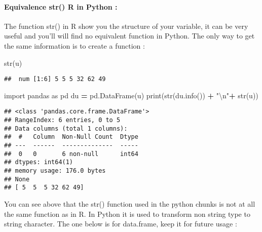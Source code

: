 \documentclass[
]{article}
\newenvironment{Shaded}{\begin{snugshade}}{\end{snugshade}}
\newcommand{\BuiltInTok}[1]{#1}
\newcommand{\CharTok}[1]{\textcolor[rgb]{0.31,0.60,0.02}{#1}}
\newcommand{\FunctionTok}[1]{\textcolor[rgb]{0.00,0.00,0.00}{#1}}
\newcommand{\ImportTok}[1]{#1}
\newcommand{\NormalTok}[1]{#1}
\newcommand{\OperatorTok}[1]{\textcolor[rgb]{0.81,0.36,0.00}{\textbf{#1}}}
\newcommand{\StringTok}[1]{\textcolor[rgb]{0.31,0.60,0.02}{#1}}
\begin{document}
\newline

\hypertarget{equivalence-str-r-in-python}{%
\paragraph{Equivalence str() R in Python
:}\label{equivalence-str-r-in-python}}

The function str() in R show you the structure of your variable, it can
be very useful and you'll will find no equivalent function in Python.
The only way to get the same information is to create a function :

\begin{Shaded}
\begin{Highlighting}[]
\FunctionTok{str}\NormalTok{(u)}
\end{Highlighting}
\end{Shaded}

\begin{verbatim}
##  num [1:6] 5 5 5 32 62 49
\end{verbatim}

\begin{Shaded}
\begin{Highlighting}[]
\ImportTok{import}\NormalTok{ pandas }\ImportTok{as}\NormalTok{ pd}
\NormalTok{du }\OperatorTok{=}\NormalTok{ pd.DataFrame(u)}
\BuiltInTok{print}\NormalTok{(}\BuiltInTok{str}\NormalTok{(du.info()) }\OperatorTok{+} \StringTok{"}\CharTok{\textbackslash{}n}\StringTok{"}\OperatorTok{+} \BuiltInTok{str}\NormalTok{(u))}
\end{Highlighting}
\end{Shaded}

\begin{verbatim}
## <class 'pandas.core.frame.DataFrame'>
## RangeIndex: 6 entries, 0 to 5
## Data columns (total 1 columns):
##  #   Column  Non-Null Count  Dtype
## ---  ------  --------------  -----
##  0   0       6 non-null      int64
## dtypes: int64(1)
## memory usage: 176.0 bytes
## None
## [ 5  5  5 32 62 49]
\end{verbatim}

You can see above that the str() function used in the python chunks is
not at all the same function as in R. In Python it is used to transform
non string type to string character. \newline \newline The one below is
for data.frame, keep it for future usage :
\end{document}
